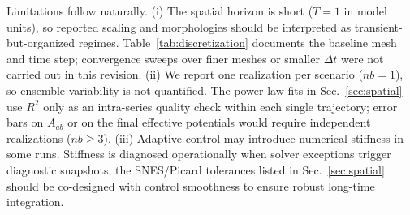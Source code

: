 Limitations follow naturally. (i) The spatial horizon is short ($T=1$ in model units), so reported scaling and morphologies should be interpreted as transient-but-organized regimes. Table~\ref{tab:discretization} documents the baseline mesh and time step; convergence sweeps over finer meshes or smaller $\Delta t$ were not carried out in this revision. (ii) We report one realization per scenario ($nb=1$), so ensemble variability is not quantified. The power-law fits in Sec.~\ref{sec:spatial} use $R^2$ only as an intra-series quality check within each single trajectory; error bars on $A_{ab}$ or on the final effective potentials would require independent realizations ($nb\geq 3$). (iii) Adaptive control may introduce numerical stiffness in some runs. Stiffness is diagnosed operationally when solver exceptions trigger diagnostic snapshots; the SNES/Picard tolerances listed in Sec.~\ref{sec:spatial} should be co-designed with control smoothness to ensure robust long-time integration.
